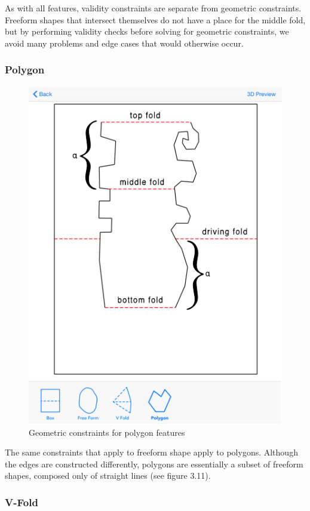 As with all features, validity constraints are separate from geometric
constraints. Freeform shapes that intersect themselves do not have a
place for the middle fold, but by performing validity checks before
solving for geometric constraints, we avoid many problems and edge cases
that would otherwise occur.

\subsubsection{Polygon}\label{polygon}

\begin{figure}[htbp]
\centering
\includegraphics{figures/45_Tech_Constraints/polygonConstraints.pdf}
\caption{Geometric constraints for polygon features}
\end{figure}

The same constraints that apply to freeform shape apply to polygons.
Although the edges are constructed differently, polygons are essentially
a subset of freeform shapes, composed only of straight lines (see figure
3.11).

\subsubsection{V-Fold}\label{v-fold}

